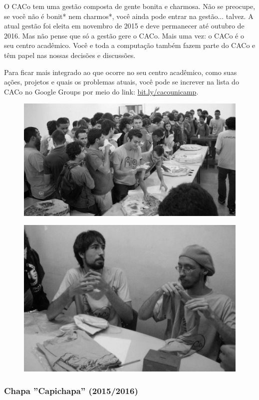 O CACo tem uma gestão composta de gente bonita e charmosa. Não se preocupe, se
você não é bonit* nem charmos*, você ainda pode entrar na gestão... talvez. A
atual gestão foi eleita em novembro de 2015 e deve permanecer até outubro de
2016. Mas não pense que só a gestão gere o CACo. Mais uma vez: o CACo é o seu
centro acadêmico. Você e toda a computação também fazem parte do CACo e têm
papel nas nossas decisões e discussões.

Para ficar mais integrado ao que ocorre no seu centro acadêmico, como suas
ações, projetos e quais os problemas atuais, você pode se increver na lista do
CACo no Google Groups por meio do link:
\url{bit.ly/cacounicamp}.

\begin{figure}[H]
    \centering
    \includegraphics[width=.45\textwidth]{img/alem_da_graduacao/caco_pizzada2.jpg}
\end{figure}

\begin{figure}[H]
    \centering
    \includegraphics[width=.45\textwidth]{img/alem_da_graduacao/caco_eleicao.jpg}
\end{figure}

\subsubsection*{Chapa ''Capichapa'' (2015/2016)}

